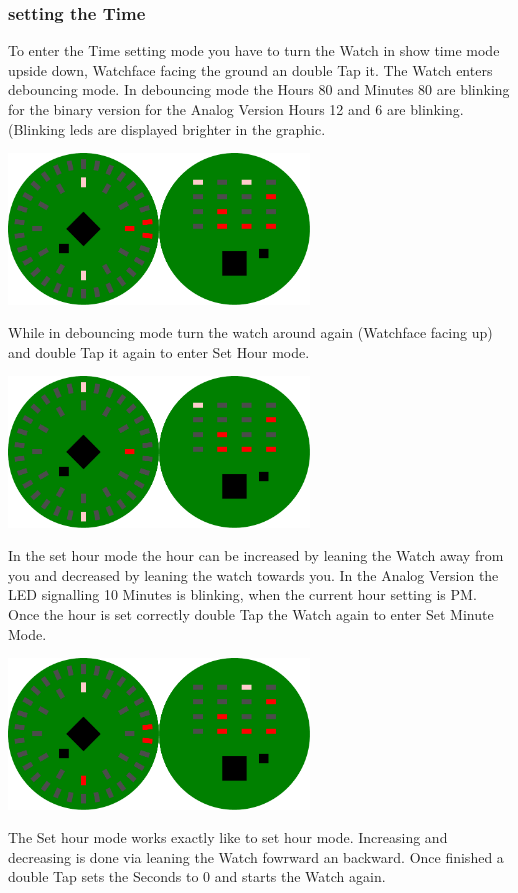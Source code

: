 \subsubsection{setting the Time}
To enter the Time setting mode you have to turn the Watch in show time mode upside down, Watchface facing the ground an double Tap it. The Watch enters debouncing mode.
In debouncing mode the Hours 80 and Minutes 80 are blinking for the binary version for the Analog Version Hours 12 and 6 are blinking. (Blinking leds are displayed brighter in the graphic.
\begin{center}
\includegraphics[width=0.6\textwidth]{../Graphics/Time3_15_debouncing}
\end{center}
While in debouncing mode turn the watch around again (Watchface facing up)  and double Tap it again to enter Set Hour mode.
\begin{center}
\includegraphics[width=0.6\textwidth]{../Graphics/Time3_15_SetHour}
\end{center}
In the set hour mode the hour can be increased by leaning the Watch away from you and decreased by leaning the watch towards you. In the Analog Version the LED signalling 10 Minutes is blinking, when the current hour setting is PM.
Once the hour is set correctly double Tap the Watch again to enter Set Minute Mode.
\begin{center}
\includegraphics[width=0.6\textwidth]{../Graphics/Time3_15_SetMinute}
\end{center}
The Set hour mode works exactly like to set hour mode. Increasing and decreasing is done via leaning the Watch fowrward an backward. Once finished a double Tap sets the Seconds to 0 and starts the Watch again.
